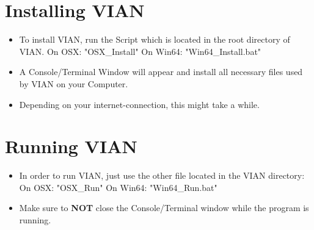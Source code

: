 \documentclass[11pt, a4paper,oneside,chapterprefix=false]{scrbook}
\begin{document}
\section{Installing VIAN}

\begin{itemize}
	\item To install VIAN, run the Script which is located in the root directory of VIAN. 
	\subitem On OSX: "OSX\_Install"
	\subitem On Win64: "Win64\_Install.bat"
	\item A Console/Terminal Window will appear and install all necessary files used by VIAN on your Computer. 
	\item Depending on your internet-connection, this might take a while.
\end{itemize}

\section{Running VIAN}
\begin{itemize}
	\item  In order to run VIAN, just use the other file located in the VIAN directory:
	\subitem On OSX: "OSX\_Run"
	\subitem On Win64: "Win64\_Run.bat"
	\item Make sure to \textbf{NOT} close the Console/Terminal window while the program is running.
\end{itemize}
\end{document}
